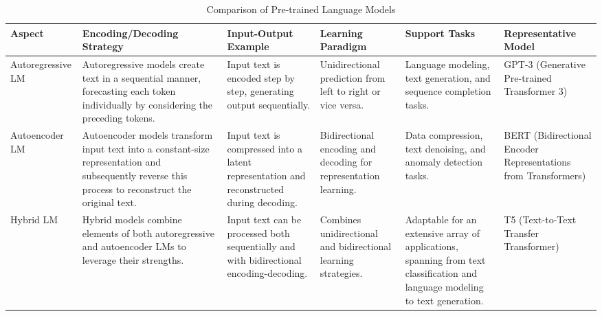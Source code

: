 \documentclass[fleqn,10pt]{thescipub} %
\begin{document}
\begin{table}
    \centering
    \caption{Comparison of Pre-trained Language Models}
    \begin{tabular}{|p{2cm}|p{3cm}|p{3cm}|p{2cm}|p{2cm}|p{2 cm}|}
        \hline
\center
        \textbf{Aspect} & \textbf{Encoding/Decoding Strategy} & \textbf{Input-Output Example} & \textbf{Learning Paradigm} & \textbf{Support Tasks} & \textbf{Representative Model} \\
        \hline
\center
        Autoregressive LM & Autoregressive models create text in a sequential manner, forecasting each token individually by considering the preceding tokens. & Input text is encoded step by step, generating output sequentially. & Unidirectional prediction from left to right or vice versa. & Language modeling, text generation, and sequence completion tasks. & GPT-3 (Generative Pre-trained Transformer 3) \\
        \hline
\center
        Autoencoder LM & Autoencoder models transform input text into a constant-size representation and subsequently reverse this process to reconstruct the original text. & Input text is compressed into a latent representation and reconstructed during decoding. & Bidirectional encoding and decoding for representation learning. & Data compression, text denoising, and anomaly detection tasks. & BERT (Bidirectional Encoder Representations from Transformers) \\
        \hline
\center
        Hybrid LM & Hybrid models combine elements of both autoregressive and autoencoder LMs to leverage their strengths. & Input text can be processed both sequentially and with bidirectional encoding-decoding. & Combines unidirectional and bidirectional learning strategies. & Adaptable for an extensive array of applications, spanning from text classification and language modeling to text generation. & T5 (Text-to-Text Transfer Transformer) \\
        \hline
    \end{tabular}
\end{table} 
\end{document}
